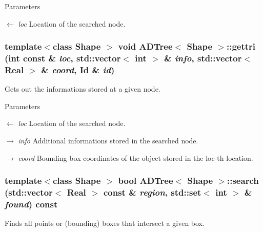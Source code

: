 \begin{DoxyParams}{Parameters}
\item[\mbox{$\leftarrow$} {\em loc}]Location of the searched node. \end{DoxyParams}
\hypertarget{classADTree_a1c1e6da98d9a00a17044d16849dfa2e8}{
\subsubsection[{gettri}]{\setlength{\rightskip}{0pt plus 5cm}template$<$class Shape $>$ void {\bf ADTree}$<$ Shape $>$::gettri (int const \& {\em loc}, \/  std::vector$<$ int $>$ \& {\em info}, \/  std::vector$<$ Real $>$ \& {\em coord}, \/  Id \& {\em id})}}
\label{classADTree_a1c1e6da98d9a00a17044d16849dfa2e8}
Gets out the informations stored at a given node.


\begin{DoxyParams}{Parameters}
\item[\mbox{$\leftarrow$} {\em loc}]Location of the searched node. \item[\mbox{$\rightarrow$} {\em info}]Additional informations stored in the searched node. \item[\mbox{$\rightarrow$} {\em coord}]Bounding box coordinates of the object stored in the loc-\/th location. \end{DoxyParams}
\hypertarget{classADTree_a1715508210a8a54094125997eb7e19d1}{
\subsubsection[{search}]{\setlength{\rightskip}{0pt plus 5cm}template$<$class Shape $>$ bool {\bf ADTree}$<$ Shape $>$::search (std::vector$<$ Real $>$ const \& {\em region}, \/  std::set$<$ int $>$ \& {\em found}) const}}
\label{classADTree_a1715508210a8a54094125997eb7e19d1}
Finds all points or (bounding) boxes that intersect a given box.


